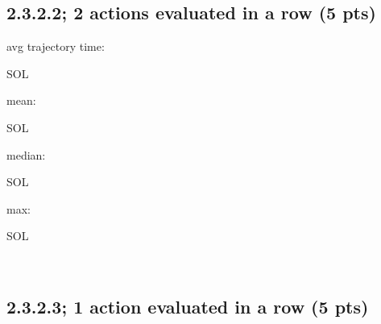 \documentclass[12pt]{article}
\begin{document}
\subsection*{2.3.2.2; 2 actions evaluated in a row (5 pts)}

avg trajectory time: \begin{tcolorbox}[fit,height=1cm, width=2cm, blank, borderline={1pt}{1pt},nobeforeafter]
    \begin{center}
    \vspace{3mm}
    \large{SOL}
    \end{center}
\end{tcolorbox}
mean: \begin{tcolorbox}[fit,height=1cm, width=2cm, blank, borderline={1pt}{1pt},nobeforeafter]
    \begin{center}
    \vspace{3mm}
    \large{SOL}
    \end{center}
\end{tcolorbox}
median: \begin{tcolorbox}[fit,height=1cm, width=2cm, blank, borderline={1pt}{1pt},nobeforeafter]
    \begin{center}
    \vspace{3mm}
    \large{SOL}
    \end{center}
\end{tcolorbox}
max: \begin{tcolorbox}[fit,height=1cm, width=2cm, blank, borderline={1pt}{1pt},nobeforeafter]
    \begin{center}
    \vspace{3mm}
    \large{SOL}
    \end{center}
\end{tcolorbox}
    \\

    
\subsection*{2.3.2.3; 1 action evaluated in a row (5 pts)}
\end{document}
